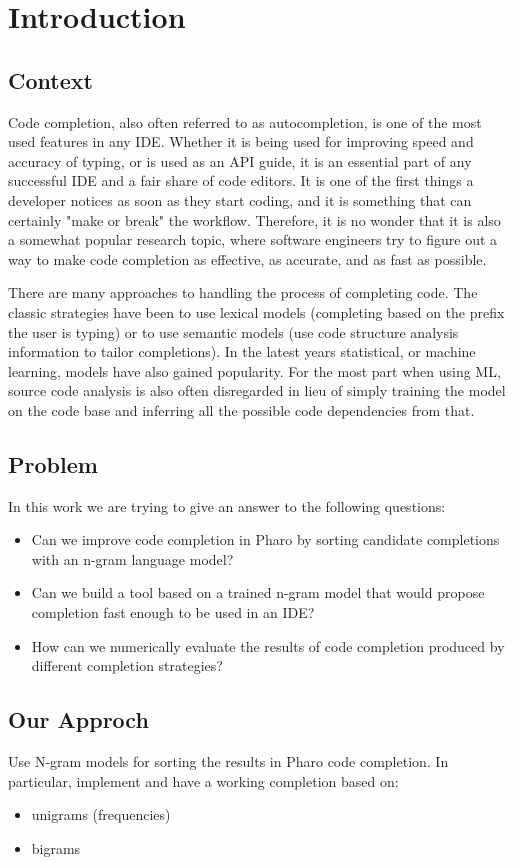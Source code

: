 \chapter{Introduction}
\label{chap:Introduction}

\section{Context}
Code completion, also often referred to as autocompletion, is one of the most used features in any IDE. Whether it is being used for improving speed and accuracy of typing, or is used as an API guide, it is an essential part of any successful IDE and a fair share of code editors. It is one of the first things a developer notices as soon as they start coding, and it is something that can certainly "make or break" the workflow. Therefore, it is no wonder that it is also a somewhat popular research topic, where software engineers try to figure out a way to make code completion as effective, as accurate, and as fast as possible.

There are many approaches to handling the process of completing code. The classic strategies have been to use lexical models (completing based on the prefix the user is typing) or to use semantic models (use code structure analysis information to tailor completions). In the latest years statistical, or machine learning, models have also gained popularity. For the most part when using ML, source code analysis is also often disregarded in lieu of simply training the model on the code base and inferring all the possible code dependencies from that.

\section{Problem}
\label{sec:Introduction-Problem}
In this work we are trying to give an answer to the following questions:
\begin{itemize}
    \item Can we improve code completion in Pharo by sorting candidate completions with an n-gram language model?
    \item Can we build a tool based on a trained n-gram model that would propose completion fast enough to be used in an IDE?
    \item How can we numerically evaluate the results of code completion produced by different completion strategies?
\end{itemize}

\section{Our Approch}
\label{sec:Introduction-Approach}
Use N-gram models for sorting the results in Pharo code completion. In particular, implement and have a working completion based on:
\begin{itemize}
    \item unigrams (frequencies)
    \item bigrams
\end{itemize}
